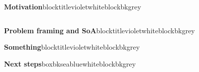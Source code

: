 \documentclass{beamer}
\author{\getStudentName}
\title{\getProjName}
\begin{document}
	
	\begin{frame}[t]
		
			
		\begin{columns}[b]
			
			\begin{column}{0.955\textwidth}
				
				\begin{customblock}[10pt]{\textbf{Motivation}}{blocktitleviolet}{white}{blockbkgrey}
					
					\vspace{20cm}
					
				\end{customblock}
		
			\end{column}
		
		\end{columns}
			
		\begin{columns}[b] 

			\begin{column}{.46\textwidth}
				
				\begin{customblock}[10pt]{\textbf{Problem framing and SoA}}{blocktitleviolet}{white}{blockbkgrey}
					
					\vspace{12cm}
					
				\end{customblock}
			
				\begin{customblock}[10pt]{\textbf{Something}}{blocktitleviolet}{white}{blockbkgrey}
					
					\vspace{35cm}
				
				\end{customblock}
				
				\begin{customblock}[10pt]{\textbf{Next steps}}{boxbkseablue}{white}{blockbkgrey}
					
					\vspace{15cm}
					
				\end{customblock}
			
			\end{column}
			
			\begin{column}{.46\textwidth}
				

\end{column}
\end{columns}
\end{frame}
\end{document}
